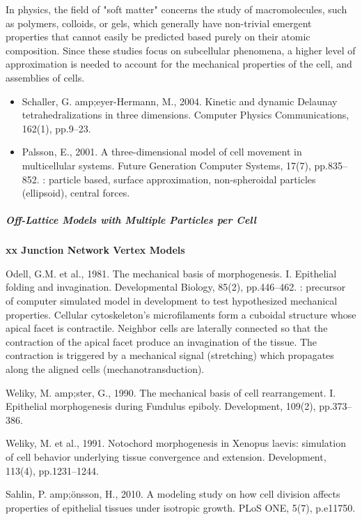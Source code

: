 In physics, the field of "soft matter" concerns the study of macromolecules, such as polymers, colloids, or gels, which generally have non-trivial emergent properties that cannot easily be predicted based purely on their atomic composition. Since these studies focus on subcellular phenomena, a higher level of approximation is needed to account for the mechanical properties of the cell, and assemblies of cells.
\begin{itemize}
	\item Schaller, G. amp;eyer-Hermann, M., 2004. Kinetic and dynamic Delaunay tetrahedralizations in three dimensions. Computer Physics Communications, 162(1), pp.9–23. \cite{Schaller:2004vs}
	\item Palsson, E., 2001. A three-dimensional model of cell movement in multicellular systems. Future Generation Computer Systems, 17(7), pp.835–852. \cite{Palsson:2001um}: particle based, surface approximation, non-spheroidal particles (ellipsoid), central forces.
\end{itemize}

\subparagraph{Off-Lattice Models with Multiple Particles per Cell}


\textbf{xx Junction Network Vertex Models}

  Odell, G.M. et al., 1981. The mechanical basis of morphogenesis. I. Epithelial folding and invagination. Developmental Biology, 85(2), pp.446–462. \cite{Odell:1981vy}: precursor of computer simulated model in development to test hypothesized mechanical properties. Cellular cytoskeleton's microfilaments form a cuboidal structure whose apical facet is contractile. Neighbor cells are laterally connected so that the contraction of the apical facet produce an invagination of the tissue. The contraction is triggered by a mechanical signal (stretching) which propagates along the aligned cells (mechanotransduction). 

  Weliky, M. amp;ster, G., 1990. The mechanical basis of cell rearrangement. I. Epithelial morphogenesis during Fundulus epiboly. Development, 109(2), pp.373–386. \cite{Weliky:1990wn}

  Weliky, M. et al., 1991. Notochord morphogenesis in Xenopus laevis: simulation of cell behavior underlying tissue convergence and extension. Development, 113(4), pp.1231–1244. \cite{Weliky:1991vf}

  Sahlin, P. amp;önsson, H., 2010. A modeling study on how cell division affects properties of epithelial tissues under isotropic growth. PLoS ONE, 5(7), p.e11750. \cite{Sahlin:2010eu}


